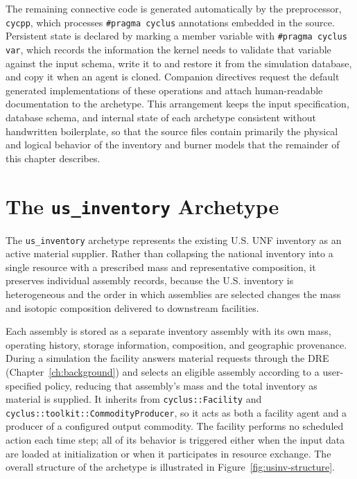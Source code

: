 The remaining connective code is generated automatically by the \Cyclus
preprocessor, \texttt{cycpp}, which processes \texttt{\#pragma cyclus}
annotations embedded in the source. Persistent state is declared by marking a
member variable with \texttt{\#pragma cyclus var}, which records the
information the kernel needs to validate that variable against the input
schema, write it to and restore it from the simulation database, and copy it
when an agent is cloned. Companion directives request the default generated
implementations of these operations and attach human-readable documentation to
the archetype. This arrangement keeps the input specification, database schema,
and internal state of each archetype consistent without handwritten
boilerplate, so that the source files contain primarily the physical and
logical behavior of the inventory and burner models that the remainder of this
chapter describes.

\section{The \texttt{us\_inventory} Archetype}
\label{sec:us-inventory-archetype}

The \texttt{us\_inventory} archetype represents the existing U.S. \gls{UNF}
inventory as an active material supplier. Rather than collapsing the national
inventory into a single resource with a prescribed mass and representative
composition, it preserves individual assembly records, because the U.S.
inventory is heterogeneous and the order in which assemblies are selected changes
the mass and isotopic composition delivered to downstream facilities.

Each assembly is stored as a separate inventory assembly with its own mass, operating
history, storage information, composition, and geographic provenance. During a
simulation the facility answers material requests through the \Cyclus \gls{DRE}
(Chapter~\ref{ch:background}) and selects an eligible assembly according to a
user-specified policy, reducing that assembly's mass and the total inventory as
material is supplied. It inherits from \texttt{cyclus::Facility} and
\texttt{cyclus::toolkit::CommodityProducer}, so it acts as both a facility agent
and a producer of a configured output commodity. The facility performs no
scheduled action each time step; all of its behavior is triggered either when the
input data are loaded at initialization or when it participates in resource
exchange. The overall structure of the archetype is illustrated in
Figure~\ref{fig:usinv-structure}.


